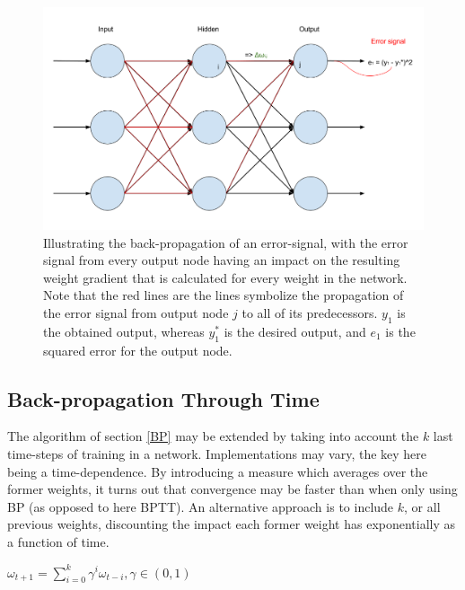 \begin{figure}
\centering
\includegraphics[width=13cm]{fig/BP_error}
\caption{Illustrating the back-propagation of an error-signal, with the error signal from every output node having an impact on the resulting weight gradient that is calculated for every weight in the network. Note that the red lines are the lines symbolize the propagation of the error signal from output node $j$ to all of its predecessors. $y_1$ is the obtained output, whereas $y_1^*$ is the desired output, and $e_1$ is the squared error for the output node.}
\label{fig:BP_error}
\end{figure}

\subsection{Back-propagation Through Time}

The algorithm of section \ref{BP} may be extended by taking into account the $k$ last time-steps of training in a network. Implementations may vary, the key here being a time-dependence. By introducing a measure which averages over the former weights, it turns out that convergence may be faster than when only using BP (as opposed to here BPTT). An alternative approach is to include $k$, or all previous weights, discounting the impact each former weight has exponentially as a function of time.

\begin{center}
\begin{math}
    \omega_{t+1} = \sum_{i=0}^{k}\gamma^i \omega_{t-i},
    \gamma \in (0, 1)
\end{math}
\end{center}


